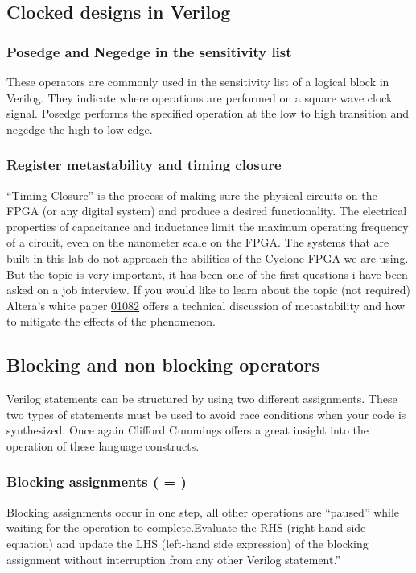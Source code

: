  \subsection{Clocked designs in Verilog}

    \subsubsection{Posedge and Negedge in the sensitivity list}
      These operators are commonly used in the sensitivity list of a logical block in Verilog. They indicate where operations are performed on a square wave clock signal. Posedge performs the specified operation at the low to high transition and negedge the high to low edge.
    
    \subsubsection{Register metastability and timing closure}
      ``Timing Closure'' is the process of making sure the physical circuits on the FPGA (or any digital system) and produce a desired functionality. The electrical properties of capacitance and inductance limit the maximum operating frequency of a circuit, even on the nanometer scale on the FPGA. The systems that are built in this lab do not approach the abilities of the Cyclone FPGA we are using. But the topic is very important, it has been one of the first questions i have been asked on a job interview. If you would like to learn about the topic (not required) Altera's white paper \href{http://www.altera.com/literature/wp/wp-01082-quartus-ii-metastability.pdf}{01082} offers a technical discussion of metastability and how to mitigate the effects of the phenomenon.

  \subsection{Blocking and non blocking operators}
    Verilog statements can be structured by using two different assignments. These two types of statements must be used to avoid race conditions when your code is synthesized. Once again Clifford Cummings offers a great insight into the operation of these language constructs. 
      
    \subsubsection{Blocking assignments \bfseries ( = )} 
      Blocking assignments occur in one step, all other operations are ``paused'' while waiting for the operation to complete.Evaluate the RHS (right-hand side equation) and update the LHS (left-hand side expression) of the blocking assignment without interruption from any other Verilog statement.''\cite{Sunburst:BlockNoBlock}

